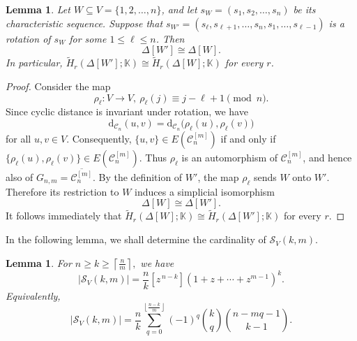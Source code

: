 \documentclass[12pt,reqno]{amsart}
\newtheorem{lemma}[theorem]{Lemma}
\theoremstyle{definition}
\numberwithin{equation}{section}
\def\C{\mathcal{C}}
\def\K{\mathbb{K}}
\begin{document}
\begin{lemma}\label{lem:rotation}
	Let $W\subseteq V=\{1,2,\ldots,n\}$, and let \( s_W=(s_1,s_2,\ldots,s_n) \) be its characteristic sequence. Suppose that \( 	s_{W'}
	=
	(s_{\ell},s_{\ell+1},\ldots,s_n,s_1,\ldots,s_{\ell-1}) \)
	is a rotation of $s_W$ for some $1\leq \ell\leq n$. Then
	\[
	\Delta[W']\cong\Delta[W].
	\]
	In particular, \( 	\widetilde H_r(\Delta[W'];\K)
	\cong
	\widetilde H_r(\Delta[W];\K) \)
	for every $r$.
\end{lemma}

\begin{proof}
	Consider the map
	\[
	\rho_{\ell}:V\longrightarrow V,~
	\rho_{\ell}(j)\equiv j-\ell+1\pmod n.
	\]
	Since cyclic distance is invariant under rotation, we have
	\[
	\mathrm{d}_{\C_n}(u,v)
	=
	\mathrm{d}_{\C_n}\bigl(\rho_{\ell}(u),\rho_{\ell}(v)\bigr)
	\]
	for all $u,v\in V$. Consequently, \( \{u,v\}\in E(\C_n^{[m]}) \) if and only if \( \{\rho_{\ell}(u),\rho_{\ell}(v)\}\in E(\C_n^{[m]}).\) Thus $\rho_{\ell}$ is an automorphism of $\C_n^{[m]}$, and hence also
	of
$G_{n,m}=\overline{\C_n^{[m]}}$.	By the definition of $W'$, the map $\rho_{\ell}$ sends $W$ onto $W'$.
	Therefore its restriction to $W$ induces a simplicial isomorphism
	\[
	\Delta[W]\cong\Delta[W'].
	\]
	It follows immediately that \( \widetilde H_r(\Delta[W];\K)
	\cong
	\widetilde H_r(\Delta[W'];\K) \)
	for every $r$.
\end{proof}



In the following lemma, we shall determine the cardinality of $\mathcal{S}_V(k,m)$.



\begin{lemma}\label{lem:count}
	For \( n\geq k\geq\left\lceil\frac{n}{m}\right\rceil, \)
	we have
	\[
	\left|\mathcal{S}_V(k,m)\right|
	=
	\frac{n}{k}
	[z^{\,n-k}]
	(1+z+\cdots+z^{m-1})^k.
	\]
	Equivalently,
	\[
	\left|\mathcal{S}_V(k,m)\right|
	=
	\frac{n}{k}
	\sum_{q=0}^{\left\lfloor\frac{n-k}{m}\right\rfloor}
	(-1)^q
	\binom{k}{q}
	\binom{n-mq-1}{k-1}.
	\]
\end{lemma}
\end{document}

